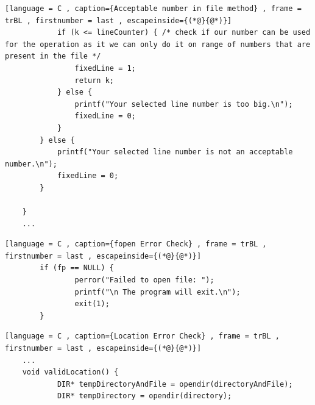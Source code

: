 \documentclass[a4paper]{article}
\theoremstyle{plain}
\theoremstyle{definition}
\theoremstyle{remark}
\begin{document}
\begin{itemize}
\begin{lstlisting}[language = C , caption={Acceptable number in file method} , frame = trBL , firstnumber = last , escapeinside={(*@}{@*)}]
			if (k <= lineCounter) { /* check if our number can be used for the operation as it we can only do it on range of numbers that are present in the file */
				fixedLine = 1;
				return k;
			} else {
				printf("Your selected line number is too big.\n");
				fixedLine = 0;
			}
		} else {
			printf("Your selected line number is not an acceptable number.\n");
			fixedLine = 0;
		}
	
	}
	...
		\end{lstlisting}
		\begin{lstlisting}[language = C , caption={fopen Error Check} , frame = trBL , firstnumber = last , escapeinside={(*@}{@*)}]
		if (fp == NULL) {
    			perror("Failed to open file: ");
    			printf("\n The program will exit.\n");
    			exit(1);
		}
		\end{lstlisting}
		\begin{lstlisting}[language = C , caption={Location Error Check} , frame = trBL , firstnumber = last , escapeinside={(*@}{@*)}]
	...		
	void validLocation() {
			DIR* tempDirectoryAndFile = opendir(directoryAndFile);
			DIR* tempDirectory = opendir(directory);


\end{lstlisting}
\end{itemize}
\end{document}
